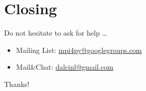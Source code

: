 \documentclass{beamer}
\newcommand{\Cpp}{C\protect\raisebox{.18ex}{++}\xspace}
\begin{document}
% 


\section*{Closing}

\begin{frame}
  \Large
  Do not hesitate to ask for help \ldots
  \begin{itemize}
  \item Mailing List: \url{mpi4py@googlegroups.com}
  \item Mail\&Chat:   \url{dalcinl@gmail.com}
  \end{itemize}
  \bigskip
  \begin{centering}
   \Huge Thanks!\par
  \end{centering}
\end{frame}
\end{document}
